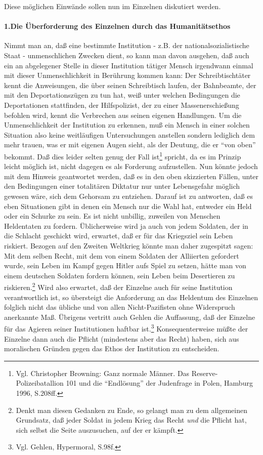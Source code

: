 \documentclass[12pt,a4paper]{article}
\begin{document}
Diese möglichen Einwände sollen nun im Einzelnen diskutiert werden.

\paragraph{1.Die Überforderung des Einzelnen durch das Humanitätsethos}

Nimmt man an, daß eine bestimmte Institution - z.B. der nationalsozialistische
Staat - unmenschlichen Zwecken dient, so kann man davon ausgehen, daß auch ein
an abgelegener Stelle in dieser Institution tätiger Mensch irgendwann einmal
mit dieser Unmenschlichkeit in Berührung kommen kann: Der Schreibtischtäter
kennt die Anweisungen, die über seinen Schreibtisch laufen, der Bahnbeamte,
der mit den Deportationszügen zu tun hat, weiß unter welchen Bedingungen die
Deportationen stattfinden, der Hilfspolizist, der zu einer Massenerschießung
befohlen wird, kennt die Verbrechen aus seinen eigenen Handlungen. Um die
Unmenschlichkeit der Institution zu erkennen, muß ein Mensch in einer solchen
Situation also keine weitläufigen Untersuchungen anstellen sondern lediglich
dem mehr trauen, was er mit eigenen Augen sieht, als der Deutung, die er "`von
oben"' bekommt. Daß dies leider selten genug der Fall ist\footnote{Vgl.
  Christopher Browning: Ganz normale Män\-ner. Das Re\-serve-Polizeibatallion
  101 und die "`Endlösung"' der Judenfrage in Polen, Hamburg 1996, S.208ff.}
spricht, da es im Prinzip leicht möglich ist, nicht dagegen es als Forderung
aufzustellen. Nun könnte jedoch mit dem Hinweis geantwortet werden, daß es in
den oben skizzierten Fällen, unter den Bedingungen einer totalitären Diktatur
nur unter Lebensgefahr möglich gewesen wäre, sich dem Gehorsam zu entziehen.
Darauf ist zu antworten, daß es eben Situationen gibt in denen ein Mensch nur
die Wahl hat, entweder ein Held oder ein Schurke zu sein. Es ist nicht
unbillig, zuweilen von Menschen Heldentaten zu fordern. Üblicherweise wird ja
auch von jedem Soldaten, der in die Schlacht geschickt wird, erwartet, daß er
für das Kriegsziel sein Leben riskiert. Bezogen auf den Zweiten Weltkrieg
könnte man daher zugespitzt sagen: Mit dem selben Recht, mit dem von einem
Soldaten der Alliierten gefordert wurde, sein Leben im Kampf gegen Hitler aufs
Spiel zu setzen, hätte man von einem deutschen Soldaten fordern können, sein
Leben beim Desertieren zu riskieren.\footnote{Denkt man diesen Gedanken zu
  Ende, so gelangt man zu dem allgemeinen Grundsatz, daß jeder Soldat in jedem
  Krieg das Recht {\em und} die Pflicht hat, sich selbst die Seite
  auszusuchen, auf der er kämpft.} Wird also erwartet, daß der Einzelne auch
für seine Institution verantwortlich ist, so übersteigt die Anforderung an das
Heldentum des Einzelnen folglich nicht das übliche und von allen
Nicht-Pazifisten ohne Widerspruch anerkannte Maß. Übrigens vertritt auch
Gehlen die Auffassung, daß der Einzelne für das Agieren seiner Institutionen
haftbar ist.\footnote{Vgl. Gehlen, Hypermoral, S.98f.} Konsequenterweise müßte
der Einzelne dann auch die Pflicht (mindestens aber das Recht) haben, sich aus
moralischen Gründen gegen das Ethos der Institution zu entscheiden.
\end{document}
